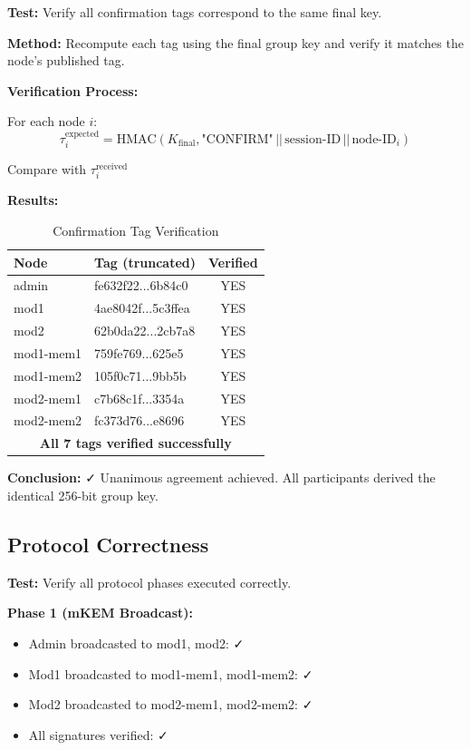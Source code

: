 \documentclass[12pt,a4paper]{report}
\begin{document}
\textbf{Test:} Verify all confirmation tags correspond to the same final key.

\textbf{Method:} Recompute each tag using the final group key and verify it matches the node's published tag.

\textbf{Verification Process:}

For each node $i$:
\[
\tau_i^{\text{expected}} = \text{HMAC}(K_{\text{final}}, \text{"CONFIRM"} \,||\, \text{session-ID} \,||\, \text{node-ID}_i)
\]

Compare with $\tau_i^{\text{received}}$

\textbf{Results:}

\begin{table}[H]
\centering
\caption{Confirmation Tag Verification}
\footnotesize
\begin{tabular}{|l|l|c|}
\hline
\textbf{Node} & \textbf{Tag (truncated)} & \textbf{Verified} \\
\hline
admin & fe632f22...6b84c0 & YES \\
mod1 & 4ae8042f...5c3ffea & YES \\
mod2 & 62b0da22...2cb7a8 & YES \\
mod1-mem1 & 759fe769...625e5 & YES \\
mod1-mem2 & 105f0c71...9bb5b & YES \\
mod2-mem1 & c7b68c1f...3354a & YES \\
mod2-mem2 & fc373d76...e8696 & YES \\
\hline
\multicolumn{3}{|c|}{\textbf{All 7 tags verified successfully}} \\
\hline
\end{tabular}
\end{table}

\textbf{Conclusion:} ✓ Unanimous agreement achieved. All participants derived the identical 256-bit group key.

\subsection{Protocol Correctness}

\textbf{Test:} Verify all protocol phases executed correctly.

\textbf{Phase 1 (mKEM Broadcast):}
\begin{itemize}
\item Admin broadcasted to mod1, mod2: ✓
\item Mod1 broadcasted to mod1-mem1, mod1-mem2: ✓
\item Mod2 broadcasted to mod2-mem1, mod2-mem2: ✓
\item All signatures verified: ✓
\end{itemize}
\end{document}

